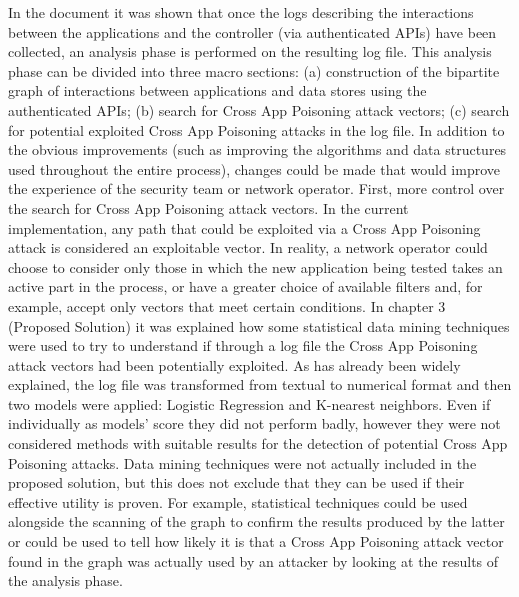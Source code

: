 {%
In the document it was shown that once the logs describing the interactions between the applications and the controller (via authenticated APIs) have been collected, an analysis phase is performed on the resulting log file. This analysis phase can be divided into three macro sections: (a) construction of the bipartite graph of interactions between applications and data stores using the authenticated APIs; (b) search for Cross App Poisoning attack vectors; (c) search for potential exploited Cross App Poisoning attacks in the log file. In addition to the obvious improvements (such as improving the algorithms and data structures used throughout the entire process), changes could be made that would improve the experience of the security team or network operator. First, more control over the search for Cross App Poisoning attack vectors. In the current implementation, any path that could be exploited via a Cross App Poisoning attack is considered an exploitable vector. In reality, a network operator could choose to consider only those in which the new application being tested takes an active part in the process, or have a greater choice of available filters and, for example, accept only vectors that meet certain conditions. In chapter 3 (Proposed Solution) it was explained how some statistical data mining techniques were used to try to understand if through a log file the Cross App Poisoning attack vectors had been potentially exploited. As has already been widely explained, the log file was transformed from textual to numerical format and then two models were applied: Logistic Regression and K-nearest neighbors. Even if individually as models' score they did not perform badly, however they were not considered methods with suitable results for the detection of potential Cross App Poisoning attacks. Data mining techniques were not actually included in the proposed solution, but this does not exclude that they can be used if their effective utility is proven. For example, statistical techniques could be used alongside the scanning of the graph to confirm the results produced by the latter or could be used to tell how likely it is that a Cross App Poisoning attack vector found in the graph was actually used by an attacker by looking at the results of the analysis phase. 
\medskip

}
